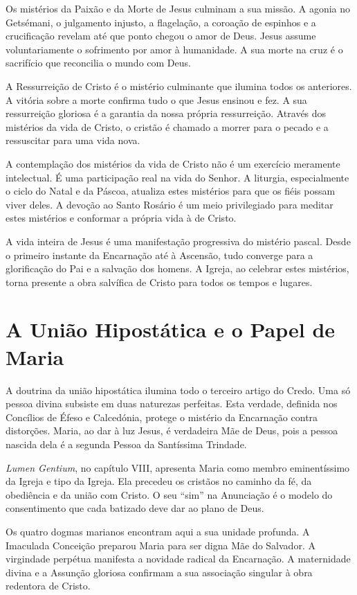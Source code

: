 Os mistérios da Paixão e da Morte de Jesus culminam a sua missão. A agonia no Getsémani, o julgamento injusto, a flagelação, a coroação de espinhos e a crucificação revelam até que ponto chegou o amor de Deus. Jesus assume voluntariamente o sofrimento por amor à humanidade. A sua morte na cruz é o sacrifício que reconcilia o mundo com Deus.

A Ressurreição de Cristo é o mistério culminante que ilumina todos os anteriores. A vitória sobre a morte confirma tudo o que Jesus ensinou e fez. A sua ressurreição gloriosa é a garantia da nossa própria ressurreição. Através dos mistérios da vida de Cristo, o cristão é chamado a morrer para o pecado e a ressuscitar para uma vida nova.

A contemplação dos mistérios da vida de Cristo não é um exercício meramente intelectual. É uma participação real na vida do Senhor. A liturgia, especialmente o ciclo do Natal e da Páscoa, atualiza estes mistérios para que os fiéis possam viver deles. A devoção ao Santo Rosário é um meio privilegiado para meditar estes mistérios e conformar a própria vida à de Cristo.

A vida inteira de Jesus é uma manifestação progressiva do mistério pascal. Desde o primeiro instante da Encarnação até à Ascensão, tudo converge para a glorificação do Pai e a salvação dos homens. A Igreja, ao celebrar estes mistérios, torna presente a obra salvífica de Cristo para todos os tempos e lugares.

\section{A União Hipostática e o Papel de Maria}

A doutrina da união hipostática ilumina todo o terceiro artigo do Credo. Uma só pessoa divina subsiste em duas naturezas perfeitas. Esta verdade, definida nos Concílios de Éfeso e Calcedónia, protege o mistério da Encarnação contra distorções. Maria, ao dar à luz Jesus, é verdadeira Mãe de Deus, pois a pessoa nascida dela é a segunda Pessoa da Santíssima Trindade.

\emph{Lumen Gentium}, no capítulo VIII, apresenta Maria como membro eminentíssimo da Igreja e tipo da Igreja. Ela precedeu os cristãos no caminho da fé, da obediência e da união com Cristo. O seu ``sim'' na Anunciação é o modelo do consentimento que cada batizado deve dar ao plano de Deus.

Os quatro dogmas marianos encontram aqui a sua unidade profunda. A Imaculada Conceição preparou Maria para ser digna Mãe do Salvador. A virgindade perpétua manifesta a novidade radical da Encarnação. A maternidade divina e a Assunção gloriosa confirmam a sua associação singular à obra redentora de Cristo.